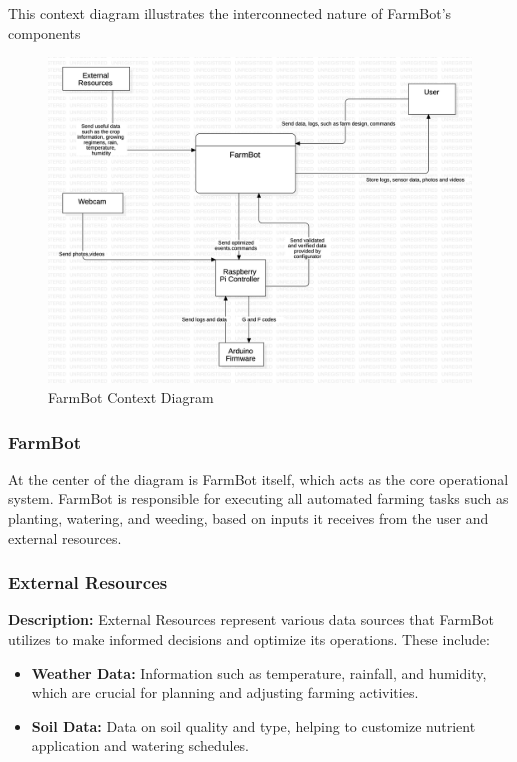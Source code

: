 This context diagram illustrates the interconnected nature of FarmBot's components 
\begin{figure}[H]
    \centering
\includegraphics[scale=0.2]{./Figures/farmbot_context_diagram.png}
\caption{FarmBot Context Diagram}
\end{figure}

\subsubsection{FarmBot}
At the center of the diagram is FarmBot itself, which acts as the core operational system. FarmBot is responsible for executing all automated farming tasks such as planting, watering, and weeding, based on inputs it receives from the user and external resources.

\subsubsection{External Resources}
\textbf{Description:} External Resources represent various data sources that FarmBot utilizes to make informed decisions and optimize its operations. These include:
\begin{itemize}
    \item \textbf{Weather Data:} Information such as temperature, rainfall, and humidity, which are crucial for planning and adjusting farming activities.
    \item \textbf{Soil Data:} Data on soil quality and type, helping to customize nutrient application and watering schedules.
\end{itemize}

